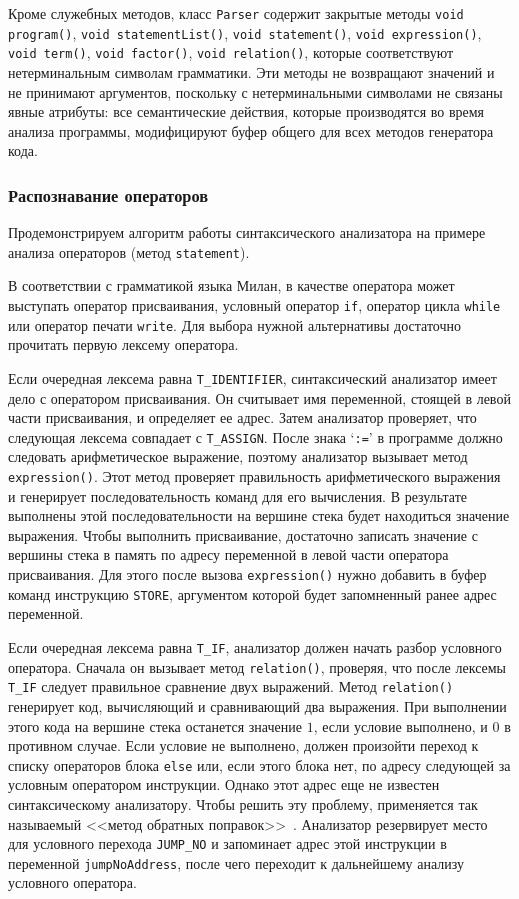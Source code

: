 \documentclass[a4paper,12pt]{article}
\begin{document}
Кроме служебных методов, класс \texttt{Parser} содержит закрытые методы
\texttt{void program()}, \texttt{void statementList()}, \texttt{void
statement()}, \texttt{void expression()}, \texttt{void term()}, \texttt{void
factor()}, \texttt{void relation()}, которые соответствуют нетерминальным
символам грамматики. Эти методы не возвращают значений и не принимают
аргументов, поскольку с нетерминальными символами не связаны явные атрибуты: все
семантические действия, которые производятся во время анализа программы,
модифицируют буфер общего для всех методов генератора кода.

\subsubsection{Распознавание операторов}

Продемонстрируем алгоритм работы синтаксического анализатора на примере анализа
операторов (метод \texttt{statement}).

В соответствии с грамматикой языка Милан, в качестве оператора может выступать
оператор присваивания, условный оператор \texttt{if}, оператор цикла
\texttt{while} или оператор печати \texttt{write}. Для выбора нужной
альтернативы достаточно прочитать первую лексему оператора.

Если очередная лексема равна \texttt{T\_IDENTIFIER}, синтаксический анализатор
имеет дело с оператором присваивания. Он считывает имя переменной, стоящей в
левой части присваивания, и определяет ее адрес. Затем анализатор проверяет, что
следующая лексема совпадает с \texttt{T\_ASSIGN}. После знака `\texttt{:=}' в
программе должно следовать арифметическое выражение, поэтому анализатор вызывает
метод \texttt{expression()}. Этот метод проверяет правильность арифметического
выражения и генерирует последовательность команд для его вычисления. В
результате выполнены этой последовательности на вершине стека будет находиться
значение выражения. Чтобы выполнить присваивание, достаточно записать значение с
вершины стека в память по адресу переменной в левой части оператора
присваивания. Для этого после вызова \texttt{expression()} нужно добавить в
буфер команд инструкцию \texttt{STORE}, аргументом которой будет запомненный
ранее адрес переменной.

Если очередная лексема равна \texttt{T\_IF}, анализатор должен начать разбор
условного оператора. Сначала он вызывает метод \texttt{relation()}, проверяя,
что после лексемы \texttt{T\_IF} следует правильное сравнение двух выражений.
Метод \texttt{relation()} генерирует код, вычисляющий и сравнивающий два
выражения. При выполнении этого кода на вершине стека останется значение $1$,
если условие выполнено, и $0$ в противном случае. Если условие не выполнено,
должен произойти переход к списку операторов блока \texttt{else} или, если этого
блока нет, по адресу следующей за условным оператором инструкции. Однако этот
адрес еще не известен синтаксическому анализатору. Чтобы решить эту проблему,
применяется так называемый <<метод обратных поправок>>~\cite{dragonbook11}.
Анализатор резервирует место для условного перехода \texttt{JUMP\_NO} и
запоминает адрес этой инструкции в переменной \texttt{jumpNoAddress}, после чего
переходит к дальнейшему анализу условного оператора.
\end{document}
